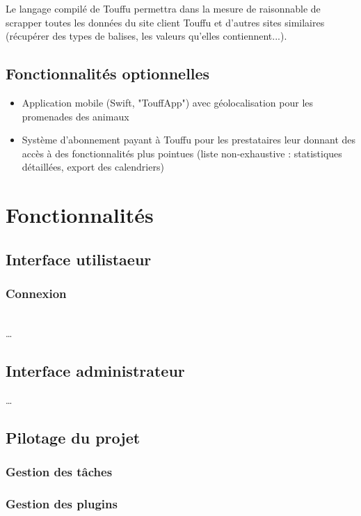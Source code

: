 \documentclass[conference]{IEEEtran}
\begin{document}
Le langage compilé de Touffu permettra dans la mesure de raisonnable de scrapper toutes les données du site client Touffu et d'autres sites similaires (récupérer des types de balises, les valeurs qu'elles contiennent...).

\subsection{Fonctionnalités optionnelles}
\begin{itemize}
	\item Application mobile (Swift, "TouffApp") avec géolocalisation pour les promenades des animaux
	\item Système d'abonnement payant à Touffu pour les prestataires leur donnant des accès à des fonctionnalités plus pointues (liste non-exhaustive : statistiques détaillées, export des calendriers)
\end{itemize}


\section{Fonctionnalités}

\subsection{Interface utilistaeur}

\subsubsection{Connexion}
\hfil\\
…

\subsection{Interface administrateur}
…

\subsection{Pilotage du projet}

\subsubsection{Gestion des tâches}

\subsubsection{Gestion des plugins}
\end{document}
